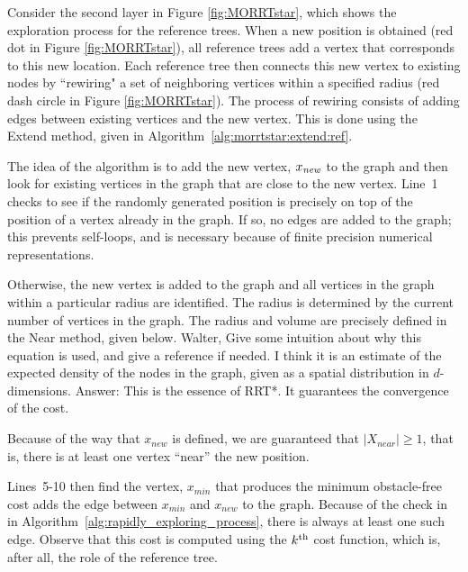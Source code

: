 \documentclass{article}
\begin{document}

Consider the second layer in Figure \ref{fig:MORRTstar}, which shows the exploration process for the reference trees.
When a new position is obtained (red dot in Figure \ref{fig:MORRTstar}), all reference trees add a vertex that corresponds to this new location.  
Each reference tree then connects this new vertex to existing nodes by ``rewiring" a set of neighboring vertices within a specified radius (red dash circle in Figure \ref{fig:MORRTstar}).  
The process of rewiring consists of adding edges between existing vertices and the new vertex.  This is done using the {\sc Extend} method, given in Algorithm~\ref{alg:morrtstar:extend:ref}.

The idea of the algorithm is to add the new vertex, $x_{\it new}$ to the graph and then look for existing vertices in the graph that are close to the new vertex. 
Line~1 checks to see if the randomly generated position is precisely on top of the position of a vertex already in the graph.  
If so, no edges are added to the graph; this prevents self-loops, and is necessary because of finite precision numerical representations.  

Otherwise, the new vertex is added to the graph and all vertices in the graph within a particular radius are identified.  
The radius is determined by the current number of vertices in the graph. 
The radius and volume are precisely defined in the {\sc Near} method, given below. 
{\sc Walter, Give some intuition about why this equation is used, and give a reference if needed.  I think it is an estimate of the expected density of the nodes in the graph, given as a spatial distribution in $d$-dimensions.}  
{\sc Answer: This is the essence of RRT*. It guarantees the convergence of the cost.}


Because of the way that $x_{new}$ is defined, we are guaranteed that $|X_{near}| \geq 1$, that is, there is at least one vertex ``near'' the new position.

Lines~5-10 then find the vertex, $x_{min}$ that produces the minimum obstacle-free cost adds the edge between $x_{min}$ and $x_{new}$ to the graph.  
Because of the check in in Algorithm~\ref{alg:rapidly_exploring_process}, there is always at least one such edge.  
Observe that this cost is computed using the $k^{\rm th}$ cost function, which is, after all, the role of the reference tree.
\end{document}
